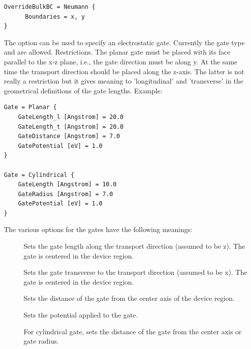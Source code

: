 \begin{verbatim}
OverrideBulkBC = Neumann {
      Boundaries = x, y   
}
\end{verbatim}




The option  can be used to specify an electrostatic gate. Currently the
gate type  and  are allowed.  Restrictions. The
planar gate must be placed with its face parallel to the x-z plane, i.e., the
gate direction must be along y. At the same time the transport direction should
be placed along the z-axis. The latter is not really a restriction but it gives
meaning to 'longitudinal' and 'transverse' in the geometrical definitions of the
gate lengths.  Example:

\begin{verbatim} 
Gate = Planar {
    GateLength_l [Angstrom] = 20.0
    GateLength_t [Angstrom] = 20.0
    GateDistance [Angstrom] = 7.0
    GatePotential [eV] = 1.0
}

Gate = Cylindrical {
    GateLength [Angstrom] = 10.0
    GateRadius [Angstrom] = 7.0
    GatePotential [eV] = 1.0
}
\end{verbatim}

The various options for the gates have the following meanings:
\begin{description}
\item[] Sets the gate length along the
  transport direction (assumed to be z). The gate is centered in the device
  region.
\item[] Sets the gate transverse to
  the transport direction (assumed to be x). The gate is centered in the device
  region.
\item[] Sets the distance of the gate
  from the center axis of the device region.
\item[] Sets the potential applied to
  the gate.
\item[] For cylindrical gate, sets the
  distance of the gate from the center axis or gate radius.
\end{description}

